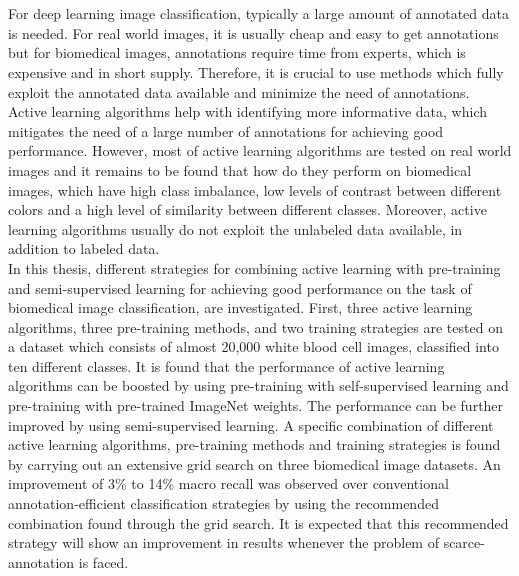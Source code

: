 \chapter{\abstractname}\label{abstract}
For deep learning image classification, typically a large amount of annotated data is needed. For real world images, it is usually cheap and easy to get annotations but for biomedical images, annotations require time from experts, which is expensive and in short supply. Therefore, it is crucial to use methods which fully exploit the annotated data available and minimize the need of annotations. Active learning algorithms help with identifying more informative data, which mitigates the need of a large number of annotations for achieving good performance. However, most of active learning algorithms are tested on real world images and it remains to be found that how do they perform on biomedical images, which have high class imbalance, low levels of contrast between different colors and a high level of similarity between different classes. Moreover, active learning algorithms usually do not exploit the unlabeled data available, in addition to labeled data. \\
In this thesis, different strategies for combining active learning with pre-training and semi-supervised learning for achieving good performance on the task of biomedical image classification, are investigated. First, three active learning algorithms, three pre-training methods, and two training strategies are tested on a dataset which consists of almost 20,000 white blood cell images, classified into ten different classes. It is found that the performance of active learning algorithms can be boosted by using pre-training with self-supervised learning and pre-training with pre-trained ImageNet weights. The performance can be further improved by using semi-supervised learning. A specific combination of different active learning algorithms, pre-training methods and training strategies is found by carrying out an extensive grid search on three biomedical image datasets. An improvement of 3\% to 14\% macro recall was observed over conventional annotation-efficient classification strategies by using the recommended combination found through the grid search. It is expected that this recommended strategy will show an improvement in results whenever the problem of scarce-annotation is faced.


